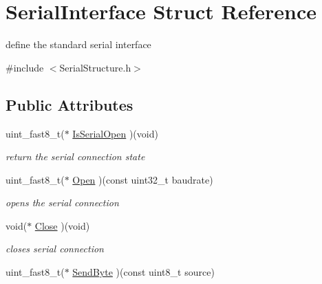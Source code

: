 \hypertarget{struct_serial_interface}{\section{Serial\-Interface Struct Reference}
\label{struct_serial_interface}
}


define the standard serial interface  




{\ttfamily \#include $<$Serial\-Structure.\-h$>$}

\subsection*{Public Attributes}
\begin{DoxyCompactItemize}
\item 
\hypertarget{struct_serial_interface_aa12245208003c78ea024ad24f9d84f2a}{uint\-\_\-fast8\-\_\-t($\ast$ \hyperlink{struct_serial_interface_aa12245208003c78ea024ad24f9d84f2a}{Is\-Serial\-Open} )(void)}\label{struct_serial_interface_aa12245208003c78ea024ad24f9d84f2a}

\begin{DoxyCompactList}\small\item\em return the serial connection state \end{DoxyCompactList}\item 
\hypertarget{struct_serial_interface_ab506189cbcec1de46dfc75142fb82068}{uint\-\_\-fast8\-\_\-t($\ast$ \hyperlink{struct_serial_interface_ab506189cbcec1de46dfc75142fb82068}{Open} )(const uint32\-\_\-t baudrate)}\label{struct_serial_interface_ab506189cbcec1de46dfc75142fb82068}

\begin{DoxyCompactList}\small\item\em opens the serial connection \end{DoxyCompactList}\item 
\hypertarget{struct_serial_interface_a6a28860e0cb0ab7a3f9c49527e883685}{void($\ast$ \hyperlink{struct_serial_interface_a6a28860e0cb0ab7a3f9c49527e883685}{Close} )(void)}\label{struct_serial_interface_a6a28860e0cb0ab7a3f9c49527e883685}

\begin{DoxyCompactList}\small\item\em closes serial connection \end{DoxyCompactList}\item 
\hypertarget{struct_serial_interface_aac8d6d754ee55b326fa8877cf5b51947}{uint\-\_\-fast8\-\_\-t($\ast$ \hyperlink{struct_serial_interface_aac8d6d754ee55b326fa8877cf5b51947}{Send\-Byte} )(const uint8\-\_\-t source)}\label{struct_serial_interface_aac8d6d754ee55b326fa8877cf5b51947}


\end{DoxyCompactItemize}
